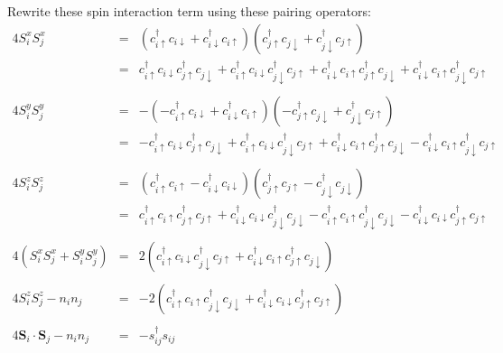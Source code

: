 \documentclass[12pt,a4paper]{article}
\newcommand{\hopping}[2] {
    c_{#1}^\dagger c_{#2}
}
\newcommand{\spinup} {
    \uparrow
}
\newcommand{\spindown} {
	\downarrow
}
\begin{document}
Rewrite these spin interaction term using these pairing operators:
\begin{eqnarray*}
    4 S_i^x S_j^x & = & \left(\hopping{i\spinup}{i\spindown} + \hopping{i\spindown}{i\spinup} \right)
                        \left(\hopping{j\spinup}{j\spindown} + \hopping{j\spindown}{j\spinup} \right) \\
                & = & \hopping{i\spinup}{i\spindown} \hopping{j\spinup}{j\spindown}
                        + \hopping{i\spinup}{i\spindown} \hopping{j\spindown}{j\spinup}
                        + \hopping{i\spindown}{i\spinup} \hopping{j\spinup}{j\spindown}
                        + \hopping{i\spindown}{i\spinup} \hopping{j\spindown}{j\spinup} \\
                & {} & \\
    4 S_i^y S_j^y & = & -\left(-\hopping{i\spinup}{i\spindown} + \hopping{i\spindown}{i\spinup} \right)
                        \left(-\hopping{j\spinup}{j\spindown} + \hopping{j\spindown}{j\spinup} \right) \\
                & = & -\hopping{i\spinup}{i\spindown} \hopping{j\spinup}{j\spindown}
                        + \hopping{i\spinup}{i\spindown} \hopping{j\spindown}{j\spinup}
                        + \hopping{i\spindown}{i\spinup} \hopping{j\spinup}{j\spindown}
                        - \hopping{i\spindown}{i\spinup} \hopping{j\spindown}{j\spinup} \\
                & {} & \\
    4 S_i^z S_j^z & = & \left(\hopping{i\spinup}{i\spinup} - \hopping{i\spindown}{i\spindown} \right)
                        \left(\hopping{j\spinup}{j\spinup} - \hopping{j\spindown}{j\spindown} \right) \\
                & = & \hopping{i\spinup}{i\spinup} \hopping{j\spinup}{j\spinup}
                        + \hopping{i\spindown}{i\spindown} \hopping{j\spindown}{j\spindown}
                        - \hopping{i\spinup}{i\spinup} \hopping{j\spindown}{j\spindown}
                        - \hopping{i\spindown}{i\spindown} \hopping{j\spinup}{j\spinup} \\
                & {} & \\
    4 \left(S_i^x S_j^x + S_i^yS_j^y \right) & = & 2 \left(
        \hopping{i\spinup}{i\spindown} \hopping{j\spindown}{j\spinup}
        + \hopping{i\spindown}{i\spinup} \hopping{j\spinup}{j\spindown} \right) \\
        & {} & \\
    4 S_i^z S_j^z  - n_i n_j & = & -2 \left( 
        \hopping{i\spinup}{i\spinup} \hopping{j\spindown}{j\spindown}
        + \hopping{i\spindown}{i\spindown} \hopping{j\spinup}{j\spinup} \right) \\
        & {} & \\
    4 \mathbf{S}_i \cdot \mathbf{S}_j - n_i n_j & = & -s_{ij}^\dagger s_{ij}
\end{eqnarray*}
\end{document}
